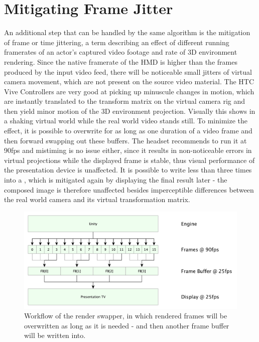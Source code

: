 %
\section{Mitigating Frame Jitter}
\label{sec:framejitter}

An additional step that can be handled by the same algorithm is the mitigation 
of frame or time jittering, a term describing an effect of different running 
framerates of an actor's captured video footage and rate of 3D environment 
rendering. Since the native framerate of the HMD is higher than the frames 
produced by the input video feed, there will be noticeable small jitters of 
virtual camera movement, which are not present on the source video material. 
The HTC Vive Controllers are very good at picking up minuscule changes in 
motion, which are instantly translated to the transform matrix on the virtual 
camera rig and then yield minor motion of the 3D environment projection. 
Visually this shows in a shaking virtual world while the real world video 
stands still.
\newline
To minimize the effect, it is possible to overwrite  for 
as long as one duration of a video frame and then forward swapping out these 
buffers. The headset recommends to run it at 90fps and mistiming is no 
issue either, since it results in non-noticeable errors in virtual projections 
while the displayed frame is stable, thus visual performance of the 
presentation device is unaffected. It is possible to write less than three 
times into a , which is mitigated again by displaying the 
final result later - the composed image is therefore unaffected besides 
imperceptible differences between the real world camera and its virtual 
transformation matrix.

\begin{figure}[htb]
	\centering
	\includegraphics[width=\textwidth]{gfx/Delay_Mitigation.pdf}
	\caption{Workflow of the render swapper, in which rendered frames will be 
		overwritten as long as it is needed - and then another frame buffer 
		will be 
		written into.}
	\label{fig:offsets:framesquashing}
\end{figure}


